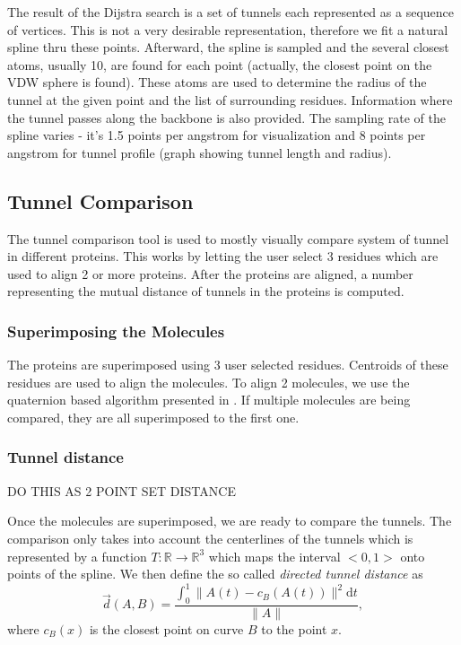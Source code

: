 \documentclass[11pt]{article} %
\newcommand{\rr}{\mathbb{R}}
\begin{document}
The result of the Dijstra search is a set of tunnels each represented as a sequence of vertices. This is not a very desirable representation, therefore we fit a natural spline thru these points. Afterward, the spline is sampled and the several closest atoms, usually 10, are found for each point (actually, the closest point on the VDW sphere is found). These atoms are used to determine the radius of the tunnel at the given point and the list of surrounding residues. Information where the tunnel passes along the backbone is also provided. The sampling rate of the spline varies - it's 1.5 points per angstrom for visualization and 8 points per angstrom for tunnel profile (graph showing tunnel length and radius).

\subsection{Tunnel Comparison}

The tunnel comparison tool is used to mostly visually compare system of tunnel in different proteins. This works by letting the user select 3 residues which are used to align 2 or more proteins. After the proteins are aligned, a number representing the mutual distance of tunnels in the proteins is computed.

\subsubsection{Superimposing the Molecules}
The proteins are superimposed using 3 user selected residues. Centroids of these residues are used to align the molecules. To align 2 molecules, we use the quaternion based algorithm presented in \cite{something}. If multiple molecules are being compared, they are all superimposed to the first one.

\subsubsection{Tunnel distance}

DO THIS AS 2 POINT SET DISTANCE

Once the molecules are superimposed, we are ready to compare the tunnels. The comparison only takes into account the centerlines of the tunnels which is represented by a function $T:\rr \rightarrow \rr^3$ which maps the interval $<0, 1>$ onto points of the spline. We then define the so called \textit{directed tunnel distance} as
\[
\vec{d}(A, B) = \frac{\int_0^1\|A(t)-c_B(A(t)) \|^2\mathrm{d}t}{\|A\|},
\]
where $c_B(x)$ is the closest point on curve $B$ to the point $x$.
\end{document}
